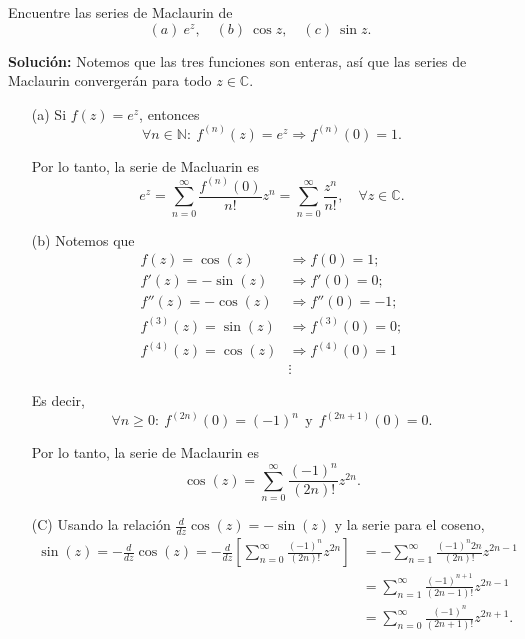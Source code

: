 \begin{ejemplo}
Encuentre las series de Maclaurin de 
$$(a) ~e^z, \quad (b)~ \cos z, \quad (c) ~\sin z. $$

\textbf{Solución:} Notemos que las tres funciones son enteras, así que las series de Maclaurin convergerán para todo $z \in \mathbb{C}$.

\begin{itemize}
    \item[(a)] Si $f(z) = e^z$, entonces
    $$\forall n \in \mathbb{N}: ~ f^{(n)}(z) = e^z \Rightarrow f^{(n)}(0) = 1.$$
    
    Por lo tanto, la serie de Macluarin es
    $$e^z = \sum_{n=0}^{\infty} \frac{f^{(n)}(0)}{n!} z^n = \sum_{n=0}^{\infty} \frac{z^n}{n!}, \quad \forall z \in \mathbb{C}.$$
    
    \item[(b)] Notemos que 
    \begin{align*}
f(z) = \cos(z) &\Rightarrow f(0) = 1; \\
f'(z) = -\sin(z)&\Rightarrow  f'(0) = 0; \\
f''(z) = - \cos(z)  &\Rightarrow  f''(0) = -1; \\
f^{(3)} (z) = \sin(z) &\Rightarrow f^{(3)}(0) = 0; \\
f^{(4)}(z) = \cos(z)  &\Rightarrow  f^{(4)}(0) = 1 \\
&\vdots
\end{align*}

Es decir,
$$\forall n \geq 0:~ f^{(2n)}(0) = (-1)^n ~~\mbox{y}~~ f^{(2n+1)}(0) = 0.$$

Por lo tanto, la serie de Maclaurin  es
$$\cos(z) = \sum_{n=0}^{\infty} \frac{(-1)^n}{(2n)!} z^{2n}.$$

    \item[(C)] Usando la relación $\frac{d}{dz} \cos(z) = - \sin(z)$ y la serie para el coseno,
    \begin{align*}
        \sin(z) = - \frac{d}{dz} \cos(z) = - \frac{d}{dz}\left[\sum_{n=0}^{\infty} \frac{(-1)^n}{(2n)!} z^{2n} \right] &= - \sum_{n=1}^{\infty} \frac{(-1)^n 2n}{(2n)!} z^{2n-1} \\
        &= \sum_{n=1}^{\infty} \frac{(-1)^{n+1}}{(2n-1)!} z^{2n-1} \\
        &= \sum_{n=0}^{\infty} \frac{(-1)^{n}}{(2n+1)!} z^{2n+1}.
    \end{align*}
\end{itemize}
\end{ejemplo}

